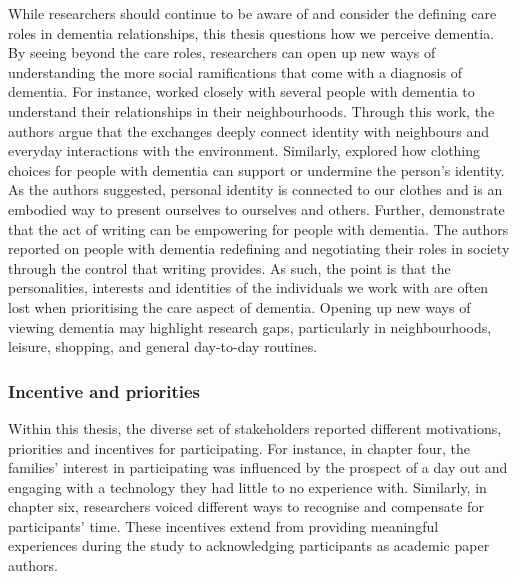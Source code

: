 While researchers should continue to be aware of and consider the defining care roles in dementia relationships, this thesis questions how we perceive dementia. By seeing beyond the care roles, researchers can open up new ways of understanding the more social ramifications that come with a diagnosis of dementia. For instance, \cite{kullberg2017walking} worked closely with several people with dementia to understand their relationships in their neighbourhoods. Through this work, the authors argue that the exchanges deeply connect identity with neighbours and everyday interactions with the environment. Similarly, \cite{twigg_dress_2013} explored how clothing choices for people with dementia can support or undermine the person's identity. As the authors suggested, personal identity is connected to our clothes and is an embodied way to present ourselves to ourselves and others. Further, \cite{ryan_dementia_2009} demonstrate that the act of writing can be empowering for people with dementia. The authors reported on people with dementia redefining and negotiating their roles in society through the control that writing provides. As such, the point is that the personalities, interests and identities of the individuals we work with are often lost when prioritising the care aspect of dementia. Opening up new ways of viewing dementia may highlight research gaps, particularly in neighbourhoods, leisure, shopping, and general day-to-day routines.

\subsubsection{Incentive and priorities }
\label{incentive}
Within this thesis, the diverse set of stakeholders reported different motivations, priorities and incentives for participating. For instance, in chapter four, the families' interest in participating was influenced by the prospect of a day out and engaging with a technology they had little to no experience with. Similarly, in chapter six, researchers voiced different ways to recognise and compensate for participants' time. These incentives extend from providing meaningful experiences during the study to acknowledging participants as academic paper authors. 

